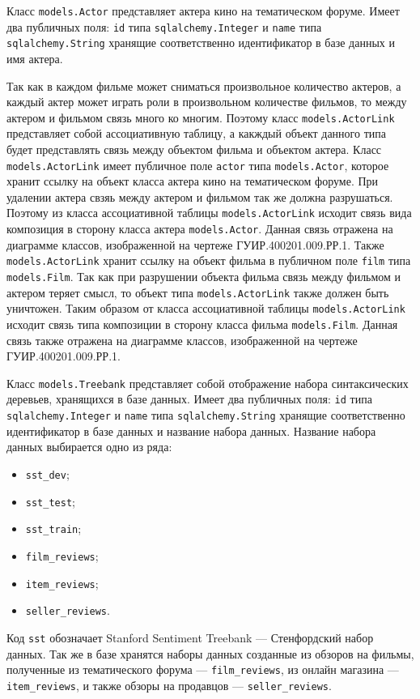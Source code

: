 Класс \texttt{models.Actor} представляет актера кино на тематическом форуме. Имеет два публичных поля: \texttt{id} типа \texttt{sqlalchemy.Integer} и \texttt{name} типа \texttt{sqlalchemy.String} хранящие соответственно идентификатор в базе данных и имя актера.

Так как в каждом фильме может сниматься произвольное количество актеров, а каждый актер может играть роли в произвольном количестве фильмов, то между актером и фильмом связь много ко многим. Поэтому класс \texttt{models.ActorLink} представляет собой ассоциативную таблицу, а какждый объект данного типа будет представлять связь между объектом фильма и объектом актера. Класс \texttt{models.ActorLink} имеет публичное поле \texttt{actor} типа \texttt{models.Actor}, которое хранит ссылку на объект класса актера кино на тематическом форуме. При удалении актера свзяь между актером и фильмом так же должна разрушаться. Поэтому из класса ассоциативной таблицы \texttt{models.ActorLink} исходит связь вида композиция в сторону класса актера \texttt{models.Actor}. Данная связь отражена на диаграмме классов, изображенной на чертеже ГУИР.400201.009.РР.1. Также \texttt{models.ActorLink} хранит ссылку на объект фильма в публичном поле \texttt{film} типа \texttt{models.Film}. Так как при разрушении объекта фильма связь между фильмом и актером теряет смысл, то объект типа \texttt{models.ActorLink} также должен быть уничтожен. Таким образом от класса ассоциативной таблицы \texttt{models.ActorLink} исходит связь типа композиции в сторону класса фильма \texttt{models.Film}. Данная связь также отражена на диаграмме классов, изображенной на чертеже ГУИР.400201.009.РР.1.

Класс \texttt{models.Treebank} представляет собой отображение набора синтаксических деревьев, хранящихся в базе данных. Имеет два публичных поля: \texttt{id} типа \texttt{sqlalchemy.Integer} и \texttt{name} типа \texttt{sqlalchemy.String} хранящие соответственно идентификатор в базе данных и название набора данных. Название набора данных выбирается одно из ряда:
\begin{itemize}
\item \texttt{sst\_dev};
\item \texttt{sst\_test};
\item \texttt{sst\_train};
\item \texttt{film\_reviews};
\item \texttt{item\_reviews};
\item \texttt{seller\_reviews}.
\end{itemize}
Код \texttt{sst} обозначает Stanford Sentiment Treebank --- Стенфордский набор данных. Так же в базе хранятся наборы данных созданные из обзоров на фильмы, полученные из тематического форума --- \texttt{film\_reviews}, из онлайн магазина --- \texttt{item\_reviews}, и также обзоры на продавцов --- \texttt{seller\_reviews}.


